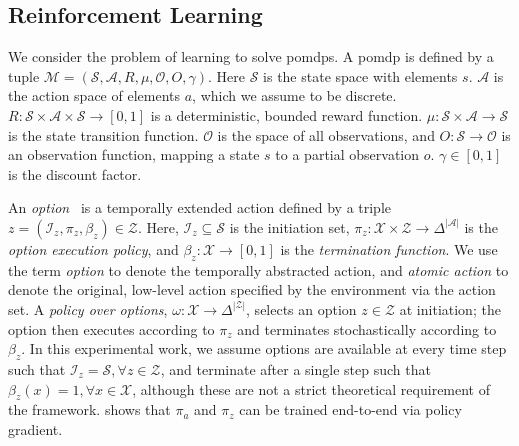 \documentclass{article}
\theoremstyle{postulate}
\begin{document}
\subsection{Reinforcement Learning}
We consider the problem of learning to solve \glspl{pomdp}.
A \gls{pomdp} is defined by a tuple $\mathcal{M} = (\mathcal{S}, \mathcal{A}, R, \mu, \mathcal{O}, O, \gamma)$.
Here $\mathcal{S}$ is the state space with elements $s$.
$\mathcal{A}$ is the action space of elements $a$, which we assume to be discrete.
$R: \mathcal{S} \times \mathcal{A} \times \mathcal{S} \rightarrow [0, 1]$ is a deterministic, bounded reward function.
$\mu: \mathcal{S} \times \mathcal{A} \rightarrow \mathcal{S}$ is the state transition function.
$\mathcal{O}$ is the space of all observations, and $O: \mathcal{S} \rightarrow \mathcal{O}$ is an observation function, mapping a state $s$ to a partial observation $o$.
$\gamma \in [0, 1]$ is the discount factor.

An \textit{option}~\citep{sutton1999between} is a temporally extended action defined by a triple $z = (\mathcal{I}_z, \pi_z, \beta_z) \in \mathcal{Z}$.
Here, $\mathcal{I}_z \subseteq \mathcal{S}$ is the initiation set, $\pi_z: \mathcal{X} \times \mathcal{Z} \rightarrow \Delta^{\lvert\mathcal{A}\lvert}$ is the \textit{option execution policy}, and $\beta_z: \mathcal{X} \rightarrow [0, 1]$ is the \textit{termination function}.
We use the term \textit{option} to denote the temporally abstracted action, and \textit{atomic action} to denote the original, low-level action specified by the environment via the action set.
A \textit{policy over options}, $\omega: \mathcal{X} \rightarrow \Delta^{|\mathcal{Z}|}$, selects an option $z \in \mathcal{Z}$ at initiation; the option then executes according to $\pi_z$ and terminates stochastically according to $\beta_z$.
In this experimental work, we assume options are available at every time step such that $\mathcal{I}_z = \mathcal{S}, \forall z \in \mathcal{Z}$, and terminate after a single step such that $\beta_z(x) = 1, \forall x \in \mathcal{X}$, although these are not a strict theoretical requirement of the framework.
\citet{bacon2017option} shows that $\pi_a$ and $\pi_z$ can be trained end-to-end via policy gradient.
\end{document}
